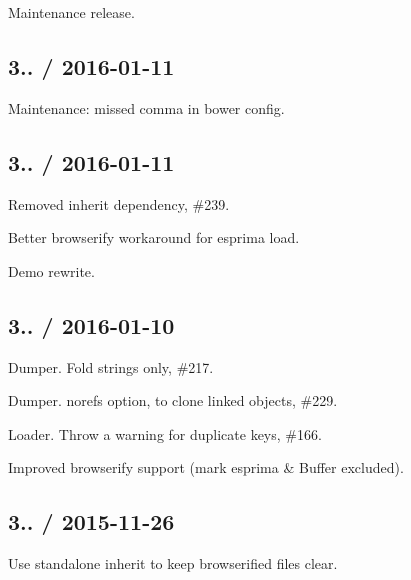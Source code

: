 \begin{DoxyItemize}
\item Maintenance release.
\end{DoxyItemize}

\subsection*{3.. / 2016-\/01-\/11 }


\begin{DoxyItemize}
\item Maintenance\+: missed comma in bower config.
\end{DoxyItemize}

\subsection*{3.. / 2016-\/01-\/11 }


\begin{DoxyItemize}
\item Removed {\ttfamily inherit} dependency, \#239.
\item Better browserify workaround for esprima load.
\item Demo rewrite.
\end{DoxyItemize}

\subsection*{3.. / 2016-\/01-\/10 }


\begin{DoxyItemize}
\item Dumper. Fold strings only, \#217.
\item Dumper. {\ttfamily norefs} option, to clone linked objects, \#229.
\item Loader. Throw a warning for duplicate keys, \#166.
\item Improved browserify support (mark {\ttfamily esprima} \& {\ttfamily Buffer} excluded).
\end{DoxyItemize}

\subsection*{3.. / 2015-\/11-\/26 }


\begin{DoxyItemize}
\item Use standalone {\ttfamily inherit} to keep browserified files clear.
\end{DoxyItemize}

